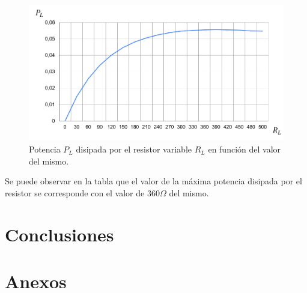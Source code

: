 \documentclass{article}
\begin{document}
            \begin{figure}[!h]
                \centering
                \includegraphics[width=1\textwidth]{graficoCuentasTeoricas.png}
                \caption{Potencia $P_L$ disipada por el resistor variable $R_L$ en función del valor del mismo.}
                \label{fig:esquemática}
            \end{figure}

            \quad Se puede observar en la tabla que el valor de la máxima potencia disipada por el resistor se corresponde con el valor de $ 360 \Omega $ del mismo.

    \section{Conclusiones}

    \section{Anexos}
\end{document}
